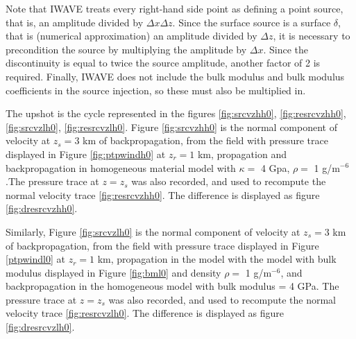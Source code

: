 Note that IWAVE treats every right-hand side point as defining a point source, that is, an amplitude divided by $\Delta x \Delta z$. Since the surface source is a surface $\delta$, that is (numerical approximation) an amplitude divided by $\Delta z$, it is necessary to precondition the source by multiplying the amplitude by $\Delta x$. Since the discontinuity is equal to twice the source amplitude, another factor of 2 is required. Finally, IWAVE does not include the bulk modulus and bulk modulus coefficients in the source injection, so these must also be multiplied in.

The upshot is the cycle represented in the figures \ref{fig:srcvzhh0},  \ref{fig:resrcvzhh0}, \ref{fig:srcvzlh0},  \ref{fig:resrcvzlh0}. Figure \ref{fig:srcvzhh0} is the normal component of velocity at $z_s=3$ km of backpropagation, from the field with pressure trace displayed in Figure \ref{fig:ptpwindh0} at $z_r=1$ km, propagation and backpropagation in homogeneous material model with $\kappa = $ 4 Gpa, $\rho = $ 1 g/m$^{-6}$.The pressure trace at $z=z_s$ was also recorded, and used to recompute the normal velocity trace \ref{fig:resrcvzhh0}. The difference is displayed as figure \ref{fig:dresrcvzhh0}.

Similarly, Figure \ref{fig:srcvzlh0} is the normal component of velocity at $z_s=3$ km of backpropagation, from the field with pressure trace displayed in Figure \ref{ptpwindl0} at $z_r=1$ km, propagation in the model with the model with bulk modulus displayed in Figure \ref{fig:bml0} and density $\rho = $ 1 g/m$^{-6}$, and backpropagation in the homogeneous model with bulk modulus = 4 GPa. The pressure trace at $z=z_s$ was also recorded, and used to recompute the normal velocity trace \ref{fig:resrcvzlh0}. The difference is displayed as figure \ref{fig:dresrcvzlh0}.






